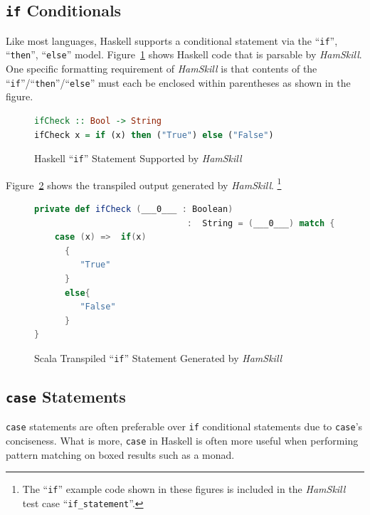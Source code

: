 \documentclass{report}
\begin{document}
\subsection{\texttt{if} Conditionals}

Like most languages, Haskell supports a conditional statement via the ``\texttt{if}'', ``\texttt{then}'', ``\texttt{else}'' model.  Figure~\ref{fig:haskellFunctionIfCheck} shows Haskell code that is parsable by \textit{HamSkill}.  One specific formatting requirement of \textit{HamSkill} is that contents of the ``\texttt{if}''/``\texttt{then}''/``\texttt{else}'' must each be enclosed within parentheses as shown in the figure.

\begin{figure}[H]
\begin{mdframed}
\begin{lstlisting}[language=Haskell]
ifCheck :: Bool -> String
ifCheck x = if (x) then ("True") else ("False")
\end{lstlisting}
\end{mdframed}
\caption{Haskell ``\texttt{if}'' Statement Supported by \textit{HamSkill}}\label{fig:haskellFunctionIfCheck}
\end{figure}

Figure~\ref{fig:scalaFunctionIfCheck} shows the transpiled output generated by \textit{HamSkill}. \footnote{The ``\texttt{if}'' example code shown in these figures is included in the \textit{HamSkill} test case ``\texttt{if\_statement}''.}

\begin{figure}[H]
\begin{mdframed}
\begin{lstlisting}[language=Scala, basicstyle=\small]
private def ifCheck (___0___ : Boolean) 
                              :  String = (___0___) match {
    case (x) =>  if(x)
      {
         "True"
      }
      else{
         "False"
      }
}
\end{lstlisting}
\end{mdframed}
\caption{Scala Transpiled ``\texttt{if}'' Statement Generated by \textit{HamSkill}}\label{fig:scalaFunctionIfCheck}
\end{figure}

\subsection{\texttt{case} Statements}

\texttt{case} statements are often preferable over \texttt{if} conditional statements due to \texttt{case}'s conciseness.  What is more, \texttt{case} in Haskell is often more useful when performing pattern matching on boxed results such as a monad.
\end{document}
